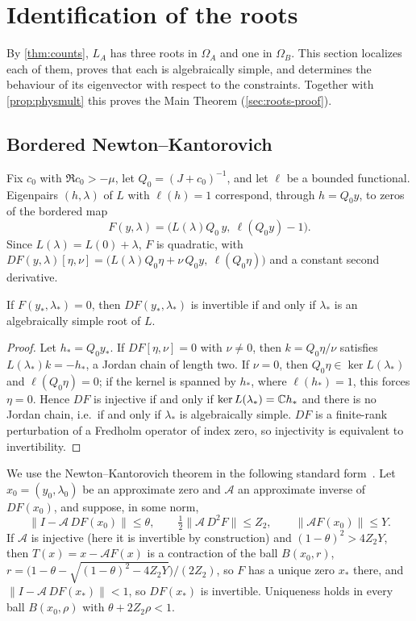 \section{Identification of the roots}\label{sec:roots}

By \cref{thm:counts}, $L_A$ has three roots in $\Omega_A$ and one in $\Omega_B$. This section localizes each of
them, proves that each is algebraically simple, and determines the behaviour of its eigenvector with respect to
the constraints. Together with \cref{prop:physmult} this proves the Main Theorem (\cref{sec:roots-proof}).

\subsection{Bordered Newton--Kantorovich}\label{sec:roots-nk}

Fix $c_0$ with $\Re c_0>-\mu$, let $Q_0=(J+c_0)^{-1}$, and let $\ell$ be a bounded functional. Eigenpairs
$(h,\lambda)$ of $L$ with $\ell(h)=1$ correspond, through $h=Q_0y$, to zeros of the bordered map
\[
  F(y,\lambda)=\big(L(\lambda)Q_0\,y,\ \ell(Q_0y)-1\big).
\]
Since $L(\lambda)=L(0)+\lambda$, $F$ is quadratic, with
$DF(y,\lambda)[\eta,\nu]=\big(L(\lambda)Q_0\eta+\nu\,Q_0y,\ \ell(Q_0\eta)\big)$ and a constant second derivative.

\begin{lemma}\label{lem:bordered}
If $F(y_*,\lambda_*)=0$, then $DF(y_*,\lambda_*)$ is invertible if and only if $\lambda_*$ is an algebraically
simple root of $L$.
\end{lemma}

\begin{proof}
Let $h_*=Q_0y_*$. If $DF[\eta,\nu]=0$ with $\nu\neq0$, then $k=Q_0\eta/\nu$ satisfies $L(\lambda_*)k=-h_*$,
a Jordan chain of length two. If $\nu=0$, then $Q_0\eta\in\ker L(\lambda_*)$ and $\ell(Q_0\eta)=0$; if the
kernel is spanned by $h_*$, where $\ell(h_*)=1$, this forces $\eta=0$. Hence $DF$ is injective if and only if
$\ker L(\lambda_*)=\mathbb{C} h_*$ and there is no Jordan chain, i.e.\ if and only if $\lambda_*$ is algebraically
simple. $DF$ is a finite-rank perturbation of a Fredholm operator of index zero, so injectivity is
equivalent to invertibility.
\end{proof}

We use the Newton--Kantorovich theorem in the following standard form~\cite{NakaoPlumWatanabe2019}. Let
$x_0=(y_0,\lambda_0)$ be an approximate zero and $\mathcal A$ an approximate inverse of $DF(x_0)$, and suppose, in
some norm,
\[
  \|I-\mathcal A\,DF(x_0)\|\le\theta,\qquad \tfrac12\|\mathcal A\,D^2F\|\le Z_2,\qquad \|\mathcal A F(x_0)\|\le Y.
\]
If $\mathcal A$ is injective (here it is invertible by construction) and $(1-\theta)^2>4Z_2Y$, then $T(x)=x-\mathcal AF(x)$ is a contraction of the ball $B(x_0,r)$,
$r=\big(1-\theta-\sqrt{(1-\theta)^2-4Z_2Y}\big)/(2Z_2)$, so $F$ has a unique zero $x_*$ there, and
$\|I-\mathcal A\,DF(x_*)\|<1$, so $DF(x_*)$ is invertible. Uniqueness holds in every ball $B(x_0,\rho)$ with
$\theta+2Z_2\rho<1$.

